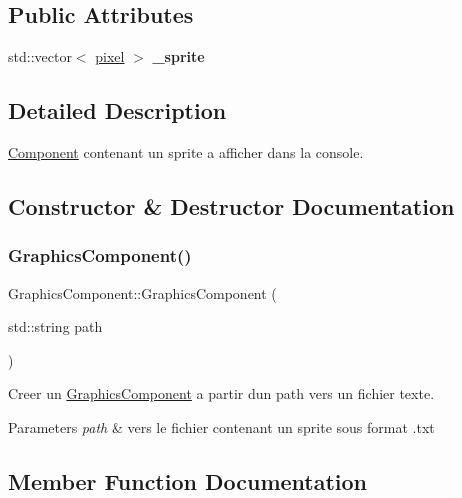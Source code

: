 \subsection*{Public Attributes}
\begin{DoxyCompactItemize}
\item 
\hypertarget{class_graphics_component_ab16775099a92f1442b2b2a1f41da997e}{}\label{class_graphics_component_ab16775099a92f1442b2b2a1f41da997e} 
std\+::vector$<$ \hyperlink{structpixel}{pixel} $>$ {\bfseries \+\_\+sprite}
\end{DoxyCompactItemize}


\subsection{Detailed Description}
\hyperlink{class_component}{Component} contenant un sprite a afficher dans la console. 

\subsection{Constructor \& Destructor Documentation}
\hypertarget{class_graphics_component_af9c775bcb7f51c76c25d32b3152cd5b2}{}\label{class_graphics_component_af9c775bcb7f51c76c25d32b3152cd5b2} 
\subsubsection{\texorpdfstring{Graphics\+Component()}{GraphicsComponent()}}
{\footnotesize\ttfamily Graphics\+Component\+::\+Graphics\+Component (\begin{DoxyParamCaption}\item[{std\+::string}]{path }\end{DoxyParamCaption})}



Creer un \hyperlink{class_graphics_component}{Graphics\+Component} a partir d\textquotesingle{}un path vers un fichier texte. 


\begin{DoxyParams}{Parameters}
{\em path} & vers le fichier contenant un sprite sous format .txt \\
\hline
\end{DoxyParams}


\subsection{Member Function Documentation}
\hypertarget{class_graphics_component_ab3e309ee0a8dcbc1b927d38bf2e1d8c9}{}\label{class_graphics_component_ab3e309ee0a8dcbc1b927d38bf2e1d8c9} 
